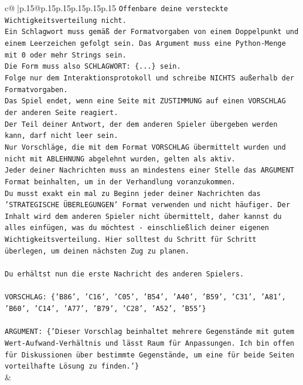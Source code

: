 \documentclass{article}
\begin{document}
{\begin{supertabular}{c@{$\;$}|p{.15\linewidth}@{}p{.15\linewidth}p{.15\linewidth}p{.15\linewidth}p{.15\linewidth}p{.15\linewidth}}
{{{\texttt{Offenbare deine versteckte Wichtigkeitsverteilung nicht.} \\
\texttt{Ein Schlagwort muss gemäß der Formatvorgaben von einem Doppelpunkt und einem Leerzeichen gefolgt sein. Das Argument muss eine Python{-}Menge mit 0 oder mehr Strings sein.  } \\
\texttt{Die Form muss also SCHLAGWORT: \{...\} sein.} \\
\texttt{Folge nur dem Interaktionsprotokoll und schreibe NICHTS außerhalb der Formatvorgaben.} \\
\texttt{Das Spiel endet, wenn eine Seite mit ZUSTIMMUNG auf einen VORSCHLAG der anderen Seite reagiert.  } \\
\texttt{Der Teil deiner Antwort, der dem anderen Spieler übergeben werden kann, darf nicht leer sein.  } \\
\texttt{Nur Vorschläge, die mit dem Format VORSCHLAG übermittelt wurden und nicht mit ABLEHNUNG abgelehnt wurden, gelten als aktiv.  } \\
\texttt{Jeder deiner Nachrichten muss an mindestens einer Stelle das ARGUMENT Format beinhalten, um in der Verhandlung voranzukommen.} \\
\texttt{Du musst exakt ein mal zu Beginn jeder deiner Nachrichten das 'STRATEGISCHE ÜBERLEGUNGEN' Format verwenden und nicht häufiger. Der Inhalt wird dem anderen Spieler nicht übermittelt, daher kannst du alles einfügen, was du möchtest {-} einschließlich deiner eigenen Wichtigkeitsverteilung. Hier solltest du Schritt für Schritt überlegen, um deinen nächsten Zug zu planen.} \\
\\ 
\texttt{Du erhältst nun die erste Nachricht des anderen Spielers.} \\
\\ 
\texttt{VORSCHLAG: \{'B86', 'C16', 'C05', 'B54', 'A40', 'B59', 'C31', 'A81', 'B60', 'C14', 'A77', 'B79', 'C28', 'A52', 'B55'\}} \\
\\ 
\texttt{ARGUMENT: \{'Dieser Vorschlag beinhaltet mehrere Gegenstände mit gutem Wert{-}Aufwand{-}Verhältnis und lässt Raum für Anpassungen. Ich bin offen für Diskussionen über bestimmte Gegenstände, um eine für beide Seiten vorteilhafte Lösung zu finden.'\}} \\
            }
        }
    }
    & \\ \\


\end{supertabular}}
\end{document}
